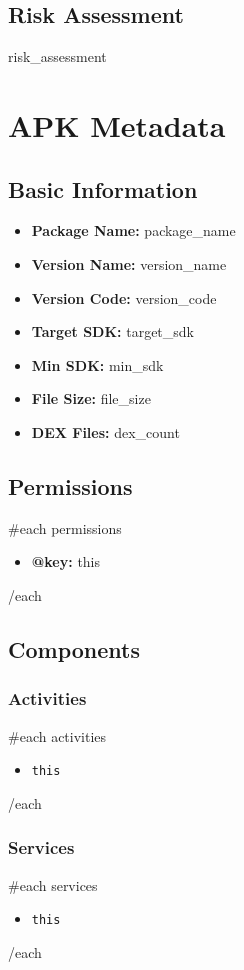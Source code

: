 \documentclass[11pt,a4paper]{article}
\begin{document}
\subsection{Risk Assessment}
{{risk_assessment}}

\section{APK Metadata}

\subsection{Basic Information}
\begin{itemize}
    \item \textbf{Package Name:} {{package_name}}
    \item \textbf{Version Name:} {{version_name}}
    \item \textbf{Version Code:} {{version_code}}
    \item \textbf{Target SDK:} {{target_sdk}}
    \item \textbf{Min SDK:} {{min_sdk}}
    \item \textbf{File Size:} {{file_size}}
    \item \textbf{DEX Files:} {{dex_count}}
\end{itemize}

\subsection{Permissions}
{{#each permissions}}
\begin{itemize}
    \item \textbf{{{@key}}:} {{this}}
\end{itemize}
{{/each}}

\subsection{Components}
\subsubsection{Activities}
{{#each activities}}
\begin{itemize}
    \item \texttt{{{this}}}
\end{itemize}
{{/each}}

\subsubsection{Services}
{{#each services}}
\begin{itemize}
    \item \texttt{{{this}}}
\end{itemize}
{{/each}}
\end{document}
